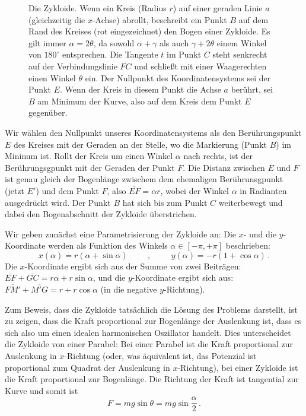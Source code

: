\begin{figure}[htb]
\caption{\label{fig_Zykloide}%
Die Zykloide. Wenn ein Kreis (Radius $r$) auf einer geraden Linie $a$ (gleichzeitig die $x$-Achse)
abrollt, beschreibt ein Punkt $B$ auf dem
Rand des Kreises (rot eingezeichnet) den Bogen einer Zykloide. Es gilt immer $\alpha=2\theta$, da
sowohl $\alpha + \gamma$ als auch $\gamma + 2\theta$ einem Winkel von $180^\circ$ entsprechen.
Die Tangente $t$ im Punkt $C$ steht senkrecht auf der Verbindungslinie $\overline{FC}$ und schlie\ss t
mit einer Waagerechten einen Winkel $\theta$ ein. Der Nullpunkt des Koordinatensystems sei der
Punkt $E$. Wenn der Kreis in diesem Punkt die Achse $a$ ber\"uhrt, sei $B$ am Minimum der Kurve, also
auf dem Kreis dem Punkt $E$ gegen\"uber.} 
\end{figure}

Wir w\"ahlen den Nullpunkt unseres Koordinatensystems als den Ber\"uhrungspunkt $E$ des Kreises mit der
Geraden an der Stelle, wo die Markierung (Punkt $B$) im Mininum ist. Rollt der Kreis
um einen Winkel $\alpha$ nach rechts, ist der Ber\"uhrungsgpunkt mit der Geraden der Punkt $F$. Die
Distanz zwischen $E$ und $F$ ist genau gleich der Bogenl\"ange zwischem dem ehemaligen Ber\"uhrunsgpunkt
(jetzt $E'$) und dem Punkt $F$, also $\overline{EF}=\alpha r$, wobei der Winkel $\alpha$ in Radianten ausgedr\"uckt
wird. Der Punkt $B$ hat sich bis zum Punkt $C$ weiterbewegt und dabei den
Bogenabschnitt der Zykloide \"uberstrichen.

Wir geben zun\"achst eine Parametrisierung der Zykloide an: Die $x$- und die $y$-Koordinate werden als
Funktion des Winkels $\alpha\in [-\pi,+\pi]$ beschrieben:
\begin{equation}
        x(\alpha) = r ( \alpha + \sin \alpha )    \hspace{1cm} , \hspace{1cm}   y(\alpha) = - r (1+  \cos \alpha ) \, .
\end{equation}
Die $x$-Koordinate ergibt sich aus der Summe von zwei Beitr\"agen: $\overline{EF}+\overline{GC}=r\alpha + r\sin \alpha$,
und die $y$-Koordinate ergibt sich aus: $\overline{FM'} + \overline{M'G}=r + r\cos \alpha$ (in die negative $y$-Richtung). 

Zum Beweis, dass die Zykloide tats\"achlich  die L\"osung des Problems darstellt, ist zu zeigen, dass die
Kraft proportional zur Bogenl\"ange der Auslenkung ist, dass es sich also um einen idealen harmonischen Oszillator
handelt. Dies unterscheidet die Zykloide von einer Parabel: Bei einer Parabel ist die Kraft proportional
zur Auslenkung in $x$-Richtung (oder, was \"aquivalent ist, das Potenzial ist proportional zum Quadrat der 
Auslenkung in $x$-Richtung), bei einer Zykloide ist die Kraft proportional zur Bogenl\"ange. Die Richtung der 
Kraft ist tangential zur Kurve und somit ist 
\begin{equation}
        F=mg \sin \theta=mg \sin \frac{\alpha}{2} \, .
\end{equation} 

